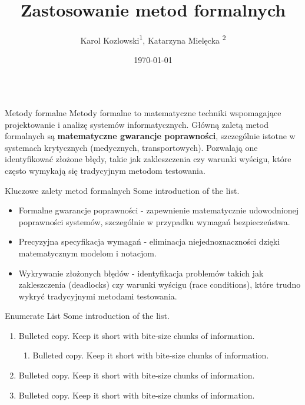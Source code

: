 \documentclass{purdue-poster}
\title{\Huge{Zastosowanie metod formalnych}}
\author{\Large{Karol Kozlowski\texorpdfstring{\textsuperscript{1}}{}, Katarzyna Mielęcka \texorpdfstring{\textsuperscript{2}}{}}}
\institute
{\large{Politechnika Warszawska},\\
Wydzial Elektryczny}
\date{\today}
\begin{document}
\begin{frame}{}
    \begin{columns}[c]
    \begin{column}{.48\linewidth}
    \begin{block}{\large Metody formalne}
        Metody formalne to matematyczne techniki wspomagające projektowanie i analizę 
        systemów informatycznych. Główną zaletą metod formalnych są \textbf{matematyczne gwarancje poprawności}, 
        szczególnie istotne w systemach krytycznych (medycznych, transportowych).
        Pozwalają one identyfikować złożone błędy, takie jak zakleszczenia czy warunki wyścigu, 
        które często wymykają się tradycyjnym metodom testowania. 

    \end{block}

    \begin{block}{Kluczowe zalety metod formalnych}
        Some introduction of the list.
        \begin{itemize}
            \item Formalne gwarancje poprawności - zapewnienie matematycznie udowodnionej poprawności systemów, szczególnie w przypadku wymagań bezpieczeństwa.
            \item Precyzyjna specyfikacja wymagań - eliminacja niejednoznaczności dzięki matematycznym modelom i notacjom.
            \item Wykrywanie złożonych błędów - identyfikacja problemów takich jak zakleszczenia (deadlocks) czy warunki wyścigu (race conditions), które trudno wykryć tradycyjnymi metodami testowania.
        \end{itemize}
    \end{block}

    \begin{block}{Enumerate List}
        Some introduction of the list.
        \begin{enumerate}
            \item Bulleted copy. Keep it short with bite-size chunks of information.
            \begin{enumerate}
                \item Bulleted copy. Keep it short with bite-size chunks of information.
            \end{enumerate}
            \item Bulleted copy. Keep it short with bite-size chunks of information.
            \item Bulleted copy. Keep it short with bite-size chunks of information.
        \end{enumerate}
    \end{block}


\end{column}
\end{columns}
\end{frame}
\end{document}
